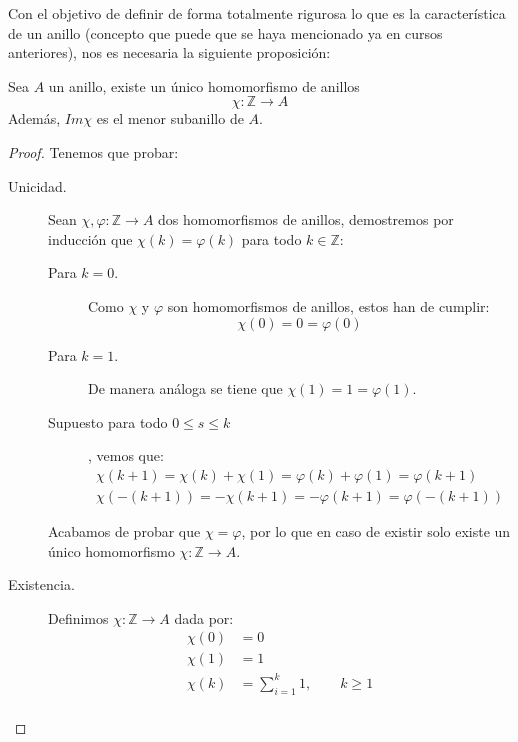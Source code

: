 \noindent
Con el objetivo de definir de forma totalmente rigurosa lo que es la característica de un anillo (concepto que puede que se haya mencionado ya en cursos anteriores), nos es necesaria la siguiente proposición:
\begin{prop}
    Sea $A$ un anillo, existe un único homomorfismo de anillos
    \begin{equation*}
        \chi:\mathbb{Z}\to A
    \end{equation*}
    Además, $Im\chi$ es el menor subanillo de $A$.
    \begin{proof}
        Tenemos que probar:
        \begin{description}
            \item [Unicidad.] Sean $\chi,\varphi:\mathbb{Z}\to A$ dos homomorfismos de anillos, demostremos por inducción que $\chi(k) = \varphi(k)$ para todo $k\in \mathbb{Z}$:
                \begin{description}
                    \item [Para $k=0$.] Como $\chi$ y $\varphi$ son homomorfismos de anillos, estos han de cumplir: 
                        \begin{equation*}
                            \chi(0) = 0 = \varphi(0)
                        \end{equation*}
                    \item [Para $k=1$.] De manera análoga se tiene que $\chi(1) = 1 = \varphi(1)$.
                    \item [Supuesto para todo $0\leq s\leq k$], vemos que:
                        \begin{gather*}
                            \chi(k+1) = \chi(k) + \chi(1) = \varphi(k) + \varphi(1) = \varphi(k+1) \\
                            \chi(-(k+1)) = -\chi(k+1) = -\varphi(k+1) = \varphi(-(k+1))
                        \end{gather*}
                \end{description}
                Acabamos de probar que $\chi = \varphi$, por lo que en caso de existir solo existe un único homomorfismo $\chi:\mathbb{Z}\to A$.
            \item [Existencia.] Definimos $\chi:\mathbb{Z}\to A$ dada por:
                \begin{align*}
                    \chi(0) &= 0 \\
                    \chi(1) &= 1 \\
                    \chi(k) &= \sum_{i=1}^{k} 1, \qquad k\geq 1 \\

\end{align*}
\end{description}
\end{proof}
\end{prop}
